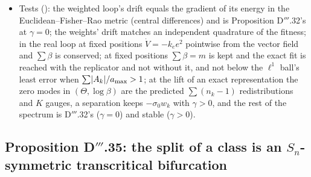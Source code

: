 \begin{itemize}
\begin{sloppypar}
    linearisation at the lift of $\vartheta^e(w)$, counts $(6,5,4)$: 15 zero modes in $(\Theta,\log\beta)$ --- the
    12 within-class redistributions and 3 gauges --- the rest stable, at $\gamma=0$ Proposition D$'''$.32's spectrum
    to $2.1\cdot10^{-11}$.\end{sloppypar}
  \item Tests (): the weighted loop's drift equals the gradient of its energy in the
    Euclidean--Fisher--Rao metric (central differences) and is Proposition D$'''$.32's at $\gamma=0$; the weights'
    drift matches an independent quadrature of the fitness; in the real loop at fixed positions $\dot V=-k_ee^2$
    pointwise from the vector field and $\sum\beta$ is conserved; at fixed positions $\sum\beta=m$ is kept and the
    exact fit is reached with the replicator and not without it, and not below the $\ell^1$ ball's least error when
    $\sum\lvert A_k\rvert/a_{\max}>1$; at the lift of an exact representation the zero modes in $(\Theta,\log\beta)$ are the
    predicted $\sum(n_k-1)$ redistributions and $K$ gauges, a separation keeps $-\sigma_0w_k$ with $\gamma>0$, and
    the rest of the spectrum is D$'''$.32's ($\gamma=0$) and stable ($\gamma>0$).
\end{itemize}

\subsection{Proposition D\texorpdfstring{$'''$}{'''}.35: the split of a class is an
\texorpdfstring{$S_n$}{S\_n}-symmetric transcritical bifurcation}

